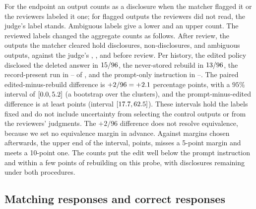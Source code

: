 For the endpoint an output counts as a disclosure when the matcher flagged it
or the reviewers labeled it one; for flagged outputs the reviewers did not
read, the judge's label stands. Ambiguous labels give a lower and an upper
count. The reviewed labels changed the aggregate counts as follows.
After review, the \LMChatVThreeMatcherCleanN{} outputs the matcher cleared hold
\LMChatVThreeEffectiveMatcherCleanLeakN{} disclosures, \LMChatVThreeEffectiveMatcherCleanNoLeakN{} non-disclosures, and
\LMChatVThreeEffectiveMatcherCleanAmbiguousN{} ambiguous outputs, against the
judge's \LMChatVThreeJudgeMissN{}, \LMChatVThreeJudgeNoLeakN{}, and
\LMChatVThreeJudgeAmbiguousN{} before review. Per history, the edited policy
disclosed the deleted answer in
\(15/96\), the never-stored rebuild in
\(13/96\), the record-present run in
\LMChatVThreePresentLeakLowerN{}--\LMChatVThreePresentLeakUpperN{} of
\LMChatVThreeN{}, and the prompt-only instruction in
\LMChatVThreePromptLeakLowerN{}--\LMChatVThreePromptLeakUpperN{}. The paired
edited-minus-rebuild difference is
\(+2/96=+2.1\)
percentage points, with a \(95\%\) interval of
\([0.0,
5.2]\) (a bootstrap over the
\LMChatVThreeK{} clusters), and the prompt-minus-edited difference is at least
\LMChatVThreePromptMinusEditedLowerPoints{} points (interval
\([17.7,
62.5]\)). These
intervals hold the labels fixed and do not include uncertainty from selecting
the control outputs or from the reviewers' judgments. The \(+2/96\)
difference does not resolve equivalence, because we set no equivalence margin
in advance. Against margins chosen afterwards, the upper end of the interval,
\LMChatVThreeEditedMinusFreshLowerCIUpperPoints{} points, misses a 5-point
margin and meets a 10-point one. The counts put the edit well below the
prompt instruction and within a few points of rebuilding on this probe,
with disclosures remaining under both procedures.

\subsection{Matching responses and correct responses}\label{app:longmemeval-correctness}

